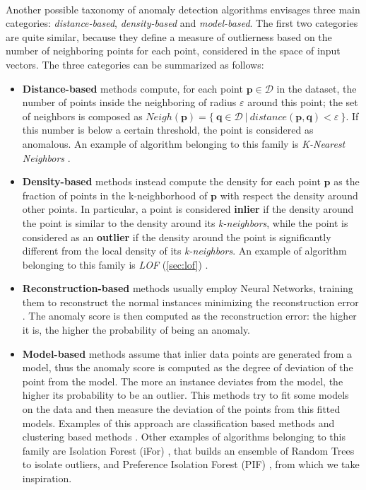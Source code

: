 \paragraph{}
Another possible taxonomy of anomaly detection algorithms envisages three main categories: \textit{distance-based}, \textit{density-based} and \textit{model-based}. The first two categories are quite similar, because they define a measure of outlierness based on the number of neighboring points for each point, considered in the space of input vectors.
The three categories can be summarized as follows:
\begin{itemize}
    \item \textbf{Distance-based} methods compute, for each point $\textbf{p} \in \mathcal{D}$ in the dataset, the number of points inside the neighboring of radius $\varepsilon$ around this point; the set of neighbors is composed as $Neigh(\textbf{p}) = \{\ \textbf{q} \in \mathcal{D}\ |\ distance(\textbf{p}, \textbf{q}) < \varepsilon\ \}$. If this number is below a certain threshold, the point is considered as anomalous. \newline
    An example of algorithm belonging to this family is \textit{K-Nearest Neighbors} \cite{knn}.
    
    \item \textbf{Density-based} methods instead compute the density for each point $\textbf{p}$ as the fraction of points in the k-neighborhood of $\textbf{p}$ with respect the density around other points. In particular, a point is considered \textbf{inlier} if the density around the point is similar to the density around its \textit{k-neighbors}, while the point is considered as an \textbf{outlier} if the density around the point is significantly different from the local density of its \textit{k-neighbors}. \newline
    An example of algorithm belonging to this family is \textit{LOF} (\ref{sec:lof}) \cite{lof}.
    
    \item \textbf{Reconstruction-based} methods usually employ Neural Networks, training them to reconstruct the normal instances minimizing the reconstruction error \cite{ae_reconstruction}. The anomaly score is then computed as the reconstruction error: the higher it is, the higher the probability of being an anomaly.
    
    \item \textbf{Model-based} methods assume that inlier data points are generated from a model, thus the anomaly score is computed as the degree of deviation of the point from the model. The more an instance deviates from the model, the higher its probability to be an outlier. This methods try to fit some models on the data and then measure the deviation of the points from this fitted models. \newline
    Examples of this approach are classification based methods \cite{ad_classific} and clustering based methods \cite{clustering_based_ad}.
    Other examples of algorithms belonging to this family are Isolation Forest (iFor) \cite{ifor}, that builds an ensemble of Random Trees to isolate outliers, and Preference Isolation Forest (PIF) \cite{pif}, from which we take inspiration.


\end{itemize}
